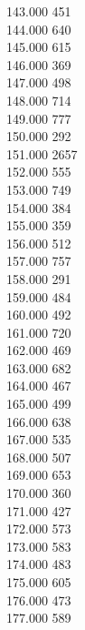 { 143.000	451 \\
 144.000	640 \\
 145.000	615 \\
 146.000	369 \\
 147.000	498 \\
 148.000	714 \\
 149.000	777 \\
 150.000	292 \\
 151.000	2657 \\
 152.000	555 \\
 153.000	749 \\
 154.000	384 \\
 155.000	359 \\
 156.000	512 \\
 157.000	757 \\
 158.000	291 \\
 159.000	484 \\
 160.000	492 \\
 161.000	720 \\
 162.000	469 \\
 163.000	682 \\
 164.000	467 \\
 165.000	499 \\
 166.000	638 \\
 167.000	535 \\
 168.000	507 \\
 169.000	653 \\
 170.000	360 \\
 171.000	427 \\
 172.000	573 \\
 173.000	583 \\
 174.000	483 \\
 175.000	605 \\
 176.000	473 \\
 177.000	589 \\
}
